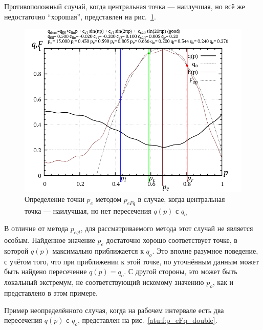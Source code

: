 Противоположный случай, когда центральная точка --- наилучшая,
но всё же недостаточно ``хорошая'', представлен на рис.~\ref{atu:f:p_eFq_good}.

\begin{figure}[htb!]
  \centerline{\includegraphics[width=60\TW]{p/p_eFq/q_p_eFq_good.png}}
  \caption{Определение точки $p_e$ методом $p_{eFq}$ в случае, когда центральная точка --- наилучшая, но нет пересечения $q(p)$ с $q_o$ }
  \label{atu:f:p_eFq_good}
\end{figure}

В отличие от метода $p_{eql}$, для рассматриваемого метода
этот случай не является особым. Найденное значение $p_e$
достаточно хорошо соответствует точке, в которой
$q(p)$ максимально приближается к $q_o$. Это вполне разумное поведение,
с учётом того, что при приближении к этой точке, по уточнённым данным
может быть найдено пересечение $q(p) = q_o$. С другой стороны,
это может быть локальный экстремум, не соответствующий искомому значению $p_o$,
как и представлено в этом примере.

Пример неопределённого случая, когда на рабочем интервале есть
два пересечения $q(p)$ с $q_o$, представлен на рис.~\ref{atu:f:p_eFq_double}.

